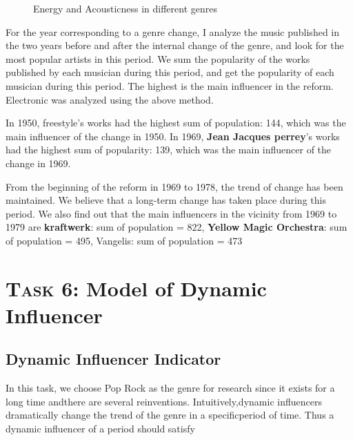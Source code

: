 \documentclass[12pt]{article}  %
\begin{document}
	\begin{figure}[htbp]
		\centering    
		\caption{Energy and Acousticness in different genres}		%
		\label{Fig:box}									%
	\end{figure}
	
	For the year corresponding to a genre change, I analyze the music published in the two years before and after the internal change of the genre, and look for the most popular artists in this period. We sum the popularity of the works published by each musician during this period, and get the popularity of each musician during this period. The highest is the main influencer in the reform. Electronic was analyzed using the above method.
	
	In 1950, freestyle's works had the highest sum of population: 144, which was the main influencer of the change in 1950. In 1969, \textbf{Jean Jacques perrey}'s works had the highest sum of popularity: 139, which was the main influencer of the change in 1969.
	
	From the beginning of the reform in 1969 to 1978, the trend of change has been maintained. We believe that a long-term change has taken place during this period. We also find out that the main influencers in the vicinity from 1969 to 1979 are \textbf{kraftwerk}: sum of population = 822, \textbf{Yellow Magic Orchestra}: sum of population = 495, Vangelis: sum of population = 473
	
	\section{\textsc{Task 6}: Model of Dynamic Influencer}
	
	\subsection{Dynamic Influencer Indicator}
	
	In this task, we choose Pop Rock as the genre for research since it exists for a long time andthere are several reinventions.
	Intuitively,dynamic influencers dramatically change the trend of the genre in a specificperiod of time. Thus a dynamic influencer of a period should satisfy
	
\end{document}
